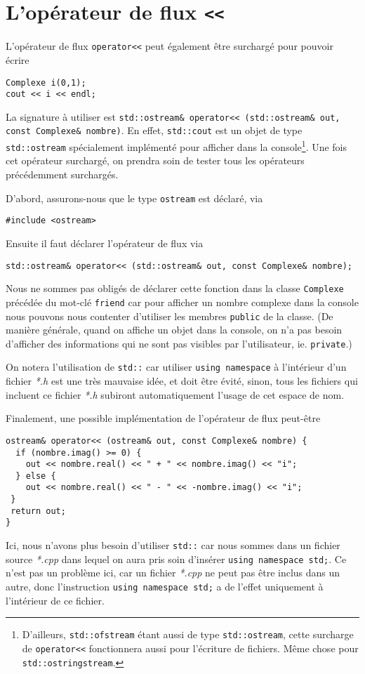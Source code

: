 \documentclass{book}
\newcommand{\inline}[1]{\texttt{#1}}
\def\filename{\emph}
\begin{document}

\section{L'opérateur de flux \texttt{<<}}
L'opérateur de flux \inline{operator<<} peut également être surchargé pour pouvoir écrire
\begin{verbatim}
Complexe i(0,1);
cout << i << endl;
\end{verbatim}
La signature à utiliser est \inline{std::ostream& operator<< (std::ostream& out, const Complexe& nombre)}. En effet, \inline{std::cout} est un objet de type \inline{std::ostream} spécialement implémenté pour afficher dans la console\footnote{D'ailleurs, \inline{std::ofstream} étant aussi de type \inline{std::ostream}, cette surcharge de \inline{operator<<} fonctionnera aussi pour l'écriture de fichiers. Même chose pour \inline{std::ostringstream}.}. Une fois cet opérateur surchargé, on prendra soin de tester tous les opérateurs précédemment surchargés.

\begin{correction}
D'abord, assurons-nous que le type \inline{ostream} est déclaré, via
\begin{verbatim}
#include <ostream>
\end{verbatim}
Ensuite il faut déclarer l'opérateur de flux via
\begin{verbatim}
std::ostream& operator<< (std::ostream& out, const Complexe& nombre);
\end{verbatim}
Nous ne sommes pas obligés de déclarer cette fonction dans la classe \inline{Complexe} précédée du mot-clé \inline{friend} car pour afficher un nombre complexe dans la console nous pouvons nous contenter d'utiliser les membres \inline{public} de la classe. (De manière générale, quand on affiche un objet dans la console, on n'a pas besoin d'afficher des informations qui ne sont pas visibles par l'utilisateur, ie. \inline{private}.)

On notera l'utilisation de \inline{std::} car utiliser \inline{using namespace} à l'intérieur d'un fichier \filename{*.h} est une très mauvaise idée, et doit être évité, sinon, tous les fichiers qui incluent ce fichier \emph{*.h} subiront automatiquement l'usage de cet espace de nom.

Finalement, une possible implémentation de l'opérateur de flux peut-être
\begin{verbatim}
ostream& operator<< (ostream& out, const Complexe& nombre) {
  if (nombre.imag() >= 0) {
    out << nombre.real() << " + " << nombre.imag() << "i";
  } else {
    out << nombre.real() << " - " << -nombre.imag() << "i";
 }
 return out;
}
\end{verbatim}
Ici, nous n'avons plus besoin d'utiliser \inline{std::} car nous sommes dans un fichier source \filename{*.cpp} dans lequel on aura pris soin d'insérer \inline{using namespace std;}. Ce n'est pas un problème ici, car un fichier \filename{*.cpp} ne peut pas être inclus dans un autre, donc l'instruction \inline{using namespace std;} a de l'effet uniquement à l'intérieur de ce fichier.
\end{correction}
\end{document}
